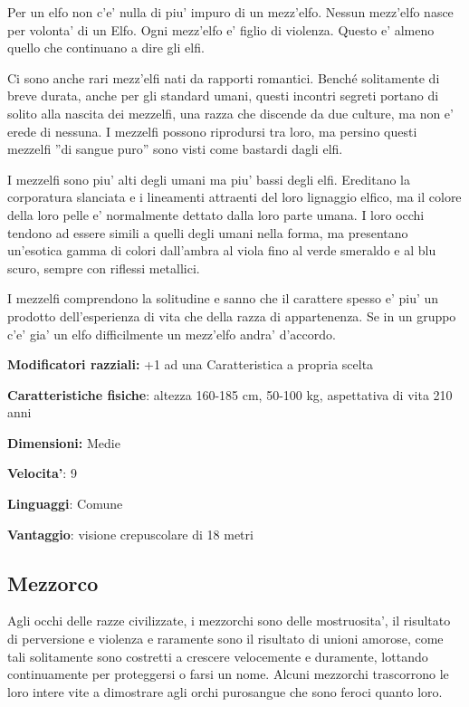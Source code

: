 \documentclass[a4paper,11pt,twoside,openany]{book}
\begin{document}
	\label{mezzelfo}
	
	Per un elfo non c'e' nulla di piu' impuro di un mezz'elfo. Nessun mezz'elfo nasce per volonta' di un Elfo. Ogni mezz'elfo e' figlio di violenza. Questo e' almeno quello che continuano a dire gli elfi.
	
	Ci sono anche rari mezz'elfi nati da rapporti romantici. Benché solitamente di breve durata, anche per gli standard umani, questi incontri segreti portano di solito alla nascita dei mezzelfi, una razza che discende da due culture, ma non e' erede di nessuna. I mezzelfi possono riprodursi tra loro, ma persino questi mezzelfi ''di sangue puro'' sono visti come bastardi dagli elfi.
	
	I mezzelfi sono piu' alti degli umani ma piu' bassi degli elfi. Ereditano la corporatura slanciata e i lineamenti attraenti del loro lignaggio elfico, ma il colore della loro pelle e' normalmente dettato dalla loro parte umana. I loro occhi tendono ad essere simili a quelli degli umani nella forma, ma presentano un'esotica gamma di colori dall'ambra al viola fino al verde smeraldo e al blu scuro, sempre con riflessi metallici.
	
	I mezzelfi comprendono la solitudine e sanno che il carattere spesso e' piu' un prodotto dell'esperienza di vita che della razza di appartenenza. Se in un gruppo c'e' gia' un elfo difficilmente un mezz'elfo andra' d'accordo.
	
	\textbf{Modificatori razziali:} +1 ad una Caratteristica a propria
	scelta
	
	\textbf{Caratteristiche fisiche}: altezza 160-185 cm, 50-100 kg, aspettativa di vita 210 anni
	
	\textbf{Dimensioni:} Medie
	
	\textbf{Velocita'}: 9
	
	\textbf{Linguaggi}: Comune
	
	\textbf{Vantaggio}: visione crepuscolare di 18 metri
	
	
	\subsection{Mezzorco}
	
	\label{mezzorco}
	
	Agli occhi delle razze civilizzate, i mezzorchi sono delle mostruosita', il risultato di perversione e violenza e raramente sono il risultato di unioni amorose, come tali solitamente sono costretti a crescere velocemente e duramente, lottando continuamente per proteggersi o farsi un nome. Alcuni mezzorchi trascorrono le loro intere vite a dimostrare agli orchi purosangue che sono feroci quanto loro.
	
\end{document}
